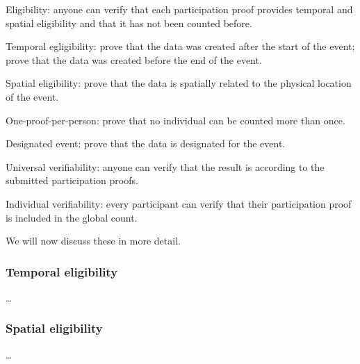 \begin{requirements}[V]
  \item\label{EligibilityVerif} Eligibility: anyone can verify that each 
    participation proof provides temporal and spatial eligibility and that it 
    has not been counted before.
    \begin{requirements}
    \item Temporal egligibility:%
      \label{CreatedAfterStart} prove that the data was created after the start of 
      the event;%
      \label{CreatedBeforeEnd} prove that the data was created before the end of 
      the event.
    \item Spatial eligibility:%
      \label{SpatiallyRelated} prove that the data is spatially related to the 
      physical location of the event.
    \item One-proof-per-person:%
      \label{CountOnce} prove that no individual can be counted more than once.
    \item Designated event:%
      \label{DesignatedEvent} prove that the data is designated for the event.
    \end{requirements}

  \item\label{UniversalVerif} Universal verifiability: anyone can verify that the 
    result is according to the submitted participation proofs.
  \item\label{IndividualVerif} Individual verifiability: every participant can 
    verify that their participation proof is included in the global count.
\end{requirements}
We will now discuss these in more detail.

\subsubsection{Temporal eligibility}

\begin{definition}
  \dots
\end{definition}

\subsubsection{Spatial eligibility}

\begin{definition}
  \dots
\end{definition}

